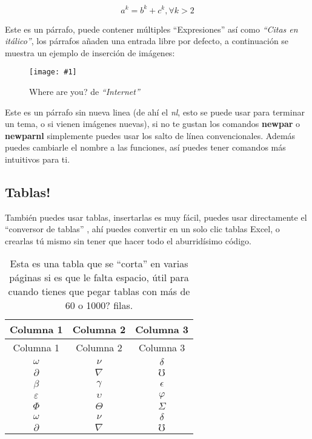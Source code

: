 \documentclass[letterpaper,11pt]{article}   %
\newcommand{\quotes}[1]{``#1''}             %
\newcommand{\quotesit}[1]{\textit{\quotes{#1}}} %
\newcommand{\newpar}[1]{\hbadness=10000 #1 ~\newline \par} %
\newcommand{\newparnl}[1]{#1 \par}          %
\newcommand{\pow}[2]{{#1}^{#2}}             %
\newcommand{\insertequation}[1]{            %
	\vspace{-0.1cm}
	\begin{mycapequ}[H]
		\begin{equation}
		#1
		\end{equation}
	\end{mycapequ}
	\vspace{-0.4cm}}
\newcommand{\insertimage}[3]{               %
	\vspace{-0.3cm}
	\begin{figure}[H]
		\centering
		\texttt{[image: \#1]}
		\caption{#3}
	\end{figure}
	\vspace{-0.2cm}}
\begin{document}
		\lipsum[1]
		
		\insertequation{\pow{a}{k}=\pow{b}{k}+\pow{c}{k}, \forall k>2}
		
		\newpar{Este es un párrafo, puede contener múltiples \quotes{Expresiones} así como \quotesit{Citas en itálico}, los párrafos añaden una entrada libre por defecto, a continuación se muestra un ejemplo de inserción de imágenes:}
		
		\insertimage{images/test-image.png}{0.2}{Where are you? de \quotesit{Internet}}
		
		\newparnl{Este es un párrafo sin nueva linea (de ahí el \textit{nl}, esto se puede usar para terminar un tema, o si vienen imágenes nuevas), si no te gustan los comandos \textbf{newpar} o \textbf{newparnl} simplemente puedes usar los salto de línea convencionales. Además puedes cambiarle el nombre a las funciones, así puedes tener comandos más intuitivos para ti.}
		
	\subsection{Tablas!}

		\newparnl{También puedes usar tablas, insertarlas es muy fácil, puedes usar directamente el \quotes{conversor de tablas} \textsuperscript{\cite{conversortabla}}, ahí puedes convertir en un solo clic tablas Excel, o crearlas tú mismo sin tener que hacer todo el aburridísimo código.}
		
		\begin{longtable}{ccc}
			\caption{Esta es una tabla que se \quotes{corta} en varias páginas si es que le falta espacio, útil para cuando tienes que pegar tablas con más de 60 o 1000? filas.}\label{foo}\\
			\hline
			Columna 1 & Columna 2 & Columna 3\\\hline
			\endfirsthead
			\hline
			Columna 1 & Columna 2 & Columna 3\\
			\hline
			\endhead
			\hline
			\endfoot
			\hline
			\endlastfoot
			$\omega$ & $\nu$ & $\delta$\\     
			$\partial$ & $\nabla$ & $\mho$\\
			$\beta$ & $\gamma$ & $\epsilon$\\   
			$\varepsilon$ & $\upsilon$ & $\varphi$\\
			$\Phi$ & $\Theta$ & $\varSigma$\\
			$\omega$ & $\nu$ & $\delta$\\     
			$\partial$ & $\nabla$ & $\mho$\\ 
		\end{longtable}
		
\end{document}
